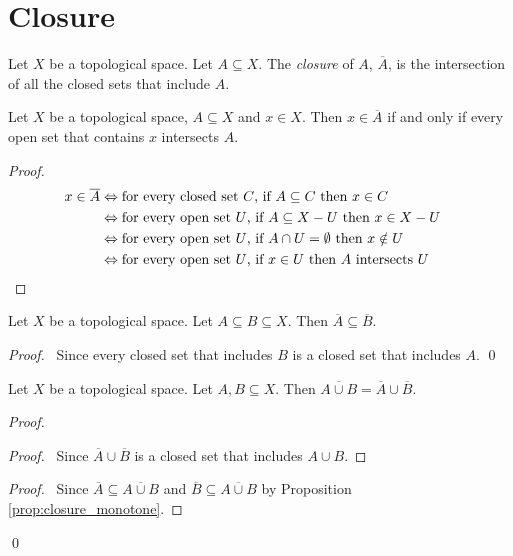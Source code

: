 \section{Closure}

\begin{df}[Closure]
Let $X$ be a topological space. Let $A \subseteq X$. The \emph{closure} of $A$, $\overline{A}$, is the intersection of all the closed sets that include $A$.
\end{df}

\begin{prop}
\label{prop:closure}
Let $X$ be a topological space, $A \subseteq X$ and $x \in X$. Then $x \in \overline{A}$ if and only if every open set that contains $x$ intersects $A$.
\end{prop}

\begin{proof}
\pf
\begin{align*}
x \in \overline{A} & \Leftrightarrow \text{for every closed set $C$, if $A \subseteq C$ then $x \in C$} \\
& \Leftrightarrow \text{for every open set $U$, if $A \subseteq X - U$ then $x \in X - U$} \\
& \Leftrightarrow \text{for every open set $U$, if $A \cap U = \emptyset$ then $x \notin U$} \\
& \Leftrightarrow \text{for every open set $U$, if $x \in U$ then $A$ intersects $U$} & \qed
\end{align*}
\end{proof}

\begin{prop}
\label{prop:closure_monotone}
Let $X$ be a topological space. Let $A \subseteq B \subseteq X$. Then $\overline{A} \subseteq \overline{B}$.
\end{prop}

\begin{proof}
\pf\ Since every closed set that includes $B$ is a closed set that includes $A$. \qed
\end{proof}

\begin{prop}
Let $X$ be a topological space. Let $A,B \subseteq X$. Then $\overline{A \cup B} = \overline{A} \cup \overline{B}$.
\end{prop}

\begin{proof}
\pf
{}
\begin{proof}
\pf\ Since $\overline{A} \cup \overline{B}$ is a closed set that includes $A \cup B$.
\end{proof}
\begin{proof}
	\pf\ Since $\overline{A} \subseteq \overline{A \cup B}$ and $\overline{B} \subseteq \overline{A \cup B}$ by Proposition \ref{prop:closure_monotone}.
\end{proof}
\qed
\end{proof}

